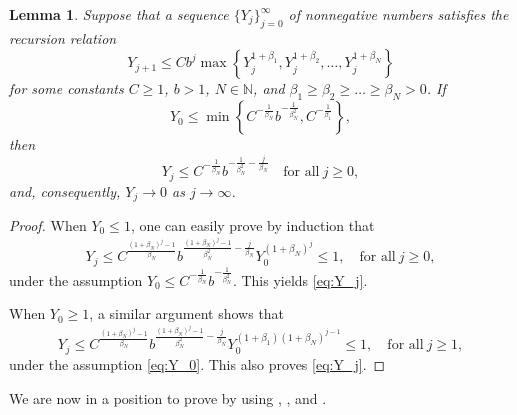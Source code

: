 \documentclass[11pt]{amsart}
\theoremstyle{plain}
\newtheorem{lemma}[theorem]{Lemma}
\theoremstyle{definition}
\numberwithin{equation}{section}
\begin{document}
\begin{lemma} \label{lem:iteration}
Suppose that a sequence $\lbrace Y_j \rbrace_{j=0}^{\infty}$ of nonnegative numbers satisfies the recursion relation
\begin{equation*}
Y_{j+1} \leq C b^{j} \max \left\lbrace Y_j^{1+\beta_1}, Y_j^{1+\beta_2}, \dots, Y_j^{1+\beta_N} \right\rbrace
\end{equation*}
for some constants $C \geq 1$, $b > 1$, $N \in \mathbb{N}$, and $\beta_1 \geq \beta_2 \geq \dots \geq \beta_N > 0$. If
\begin{equation} \label{eq:Y_0}
Y_0 \leq \min \left\lbrace C^{-\frac{1}{\beta_N}} b^{-\frac{1}{\beta_N^2}}, C^{-\frac{1}{\beta_1}} \right\rbrace,
\end{equation}
then
\begin{equation} \label{eq:Y_j}
Y_j \leq C^{-\frac{1}{\beta_N}} b^{-\frac{1}{\beta_N^2} - \frac{j}{\beta_N}} \quad\text{for all}~ j \geq 0,
\end{equation}
and, consequently, $Y_j \to 0$ as $j \to \infty$.
\end{lemma}

\begin{proof}
When $Y_0 \leq 1$, one can easily prove by induction that
\begin{equation*}
Y_j \leq C^{\frac{(1+\beta_N)^j-1}{\beta_N}} b^{\frac{(1+\beta_N)^j-1}{\beta_N^2}-\frac{j}{\beta_N}} Y_0^{(1+\beta_N)^j} \leq 1, \quad \text{for all}~ j \geq 0,
\end{equation*}
under the assumption $Y_0 \leq C^{-\frac{1}{\beta_N}} b^{-\frac{1}{\beta_N^2}}$. This yields \eqref{eq:Y_j}.

When $Y_0 \geq 1$, a similar argument shows that
\begin{equation*}
Y_j \leq C^{\frac{(1+\beta_N)^j-1}{\beta_N}} b^{\frac{(1+\beta_N)^j-1}{\beta_N^2}-\frac{j}{\beta_N}} Y_0^{(1+\beta_1)(1+\beta_N)^{j-1}} \leq 1, \quad \text{for all}~ j \geq 1,
\end{equation*}
under the assumption \eqref{eq:Y_0}. This also proves \eqref{eq:Y_j}.
\end{proof}

We are now in a position to prove  by using , , and .
\end{document}
